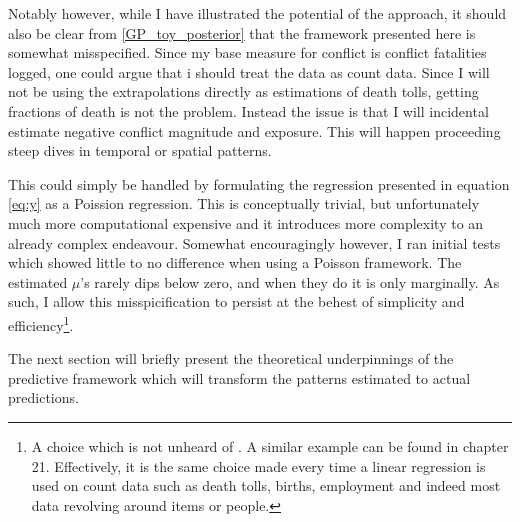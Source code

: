 \documentclass[a4paper]{article}
\begin{document}

Notably however, while I have illustrated the potential of the approach, it should also be clear from \autoref{GP_toy_posterior} that the framework presented here is somewhat misspecified. Since my base measure for conflict is conflict fatalities logged, one could argue that i should treat the data as count data. Since I will not be using the extrapolations directly as estimations of death tolls, getting fractions of death is not the problem. Instead the issue is that I will incidental estimate negative conflict magnitude and exposure. This will happen proceeding steep dives in temporal or spatial patterns.\par

This could simply be handled by formulating the regression presented in equation \ref{eq:y} as a Poission regression. This is conceptually trivial, but unfortunately much more computational expensive and it introduces more complexity to an already complex endeavour. Somewhat encouragingly however, I ran initial tests which showed little to no difference when using a Poisson framework. The estimated $\mu$'s rarely dips below zero, and when they do it is only marginally. As such, I allow this misspicification to persist at the behest of simplicity and efficiency\footnote{A choice which is not unheard of  \cite[123]{williams2006gaussian}. A similar example can be found in \cite{Gelman_2013} chapter 21. Effectively, it is the same choice made every time a linear regression is used on count data such as death tolls, births, employment and indeed most data revolving around items or people.}.\par %

The next section will briefly present the theoretical underpinnings of the predictive framework which will transform the patterns estimated to actual predictions.\par 

\end{document}

